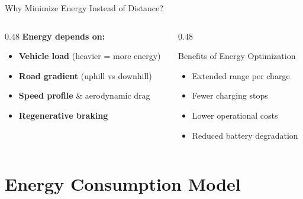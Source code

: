 \documentclass[aspectratio=169,11pt]{beamer}
\newcommand{\highlight}[1]{\textcolor{accentgreen}{\textbf{#1}}}
\begin{document}
\begin{frame}{Why Minimize Energy Instead of Distance?}
    \begin{center}
    \end{center}

    \vspace{0.5cm}
    \begin{columns}[T]
        \begin{column}{0.48\textwidth}
            \textbf{Energy depends on:}
            \begin{itemize}
                \item \highlight{Vehicle load} (heavier = more energy)
                \item \highlight{Road gradient} (uphill vs downhill)
                \item \highlight{Speed profile} \& aerodynamic drag
                \item \highlight{Regenerative braking}
            \end{itemize}
        \end{column}
        \begin{column}{0.48\textwidth}
            \begin{exampleblock}{Benefits of Energy Optimization}
                \begin{itemize}
                    \item Extended range per charge
                    \item Fewer charging stops
                    \item Lower operational costs
                    \item Reduced battery degradation
                \end{itemize}
            \end{exampleblock}
        \end{column}
    \end{columns}
\end{frame}

\section{Energy Consumption Model}
\end{document}
